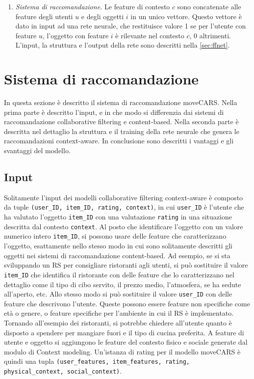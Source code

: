 \documentclass[12pt,italian]{report}
\begin{document}
\begin{enumerate}
 \item \textit{Sistema di raccomandazione.} Le feature di contesto $c$ sono concatenate alle feature degli utenti $u$ e degli oggetti $i$ in un unico vettore. Questo vettore è dato in input ad una rete neurale, che restituisce valore 1 se per l'utente con feature $u$, l'oggetto con feature $i$ è rilevante nel contesto $c$, 0 altrimenti. L'input, la struttura e l'output della rete sono descritti nella \autoref{sec:ffnet}.
\end{enumerate}

\section{Sistema di raccomandazione} \label{sec:ffnet}
In questa sezione è descritto il sistema di raccomandazione moveCARS. Nella prima parte è descritto l'input, e in che modo si differenzia dai sistemi di raccomandazione collaborative filtering e content-based. Nella seconda parte è descritta nel dettaglio la struttura e il training della rete neurale che genera le raccomandazioni context-aware. In conclusione sono descritti i vantaggi e gli svantaggi del modello.

\subsection{Input}
Solitamente l'input dei modelli collaborative filtering context-aware è composto da tuple \texttt{(user\_ID, item\_ID, rating, context)}, in cui \texttt{user\_ID} è l'utente che ha valutato l'oggetto \texttt{item\_ID} con una valutazione \texttt{rating} in una situazione descritta dal contesto \texttt{context}. Al posto che identificare l'oggetto con un valore numerico intero \texttt{item\_ID}, si possono usare delle feature che caratterizzano l'oggetto, esattamente nello stesso modo in cui sono solitamente descritti gli oggetti nei sistemi di raccomandazione content-based. Ad esempio, se si sta sviluppando un RS per consigliare ristoranti agli utenti, si può sostituire il valore \texttt{item\_ID} che identifica il ristorante con delle feature che lo caratterizzano nel dettaglio come il tipo di cibo servito, il prezzo medio, l'atmosfera, se ha sedute all'aperto, etc. Allo stesso modo si può sostituire il valore \texttt{user\_ID} con delle feature che descrivono l'utente. Queste possono essere feature non specifiche come età o genere, o feature specifiche per l'ambiente in cui il RS è implementato. Tornando all'esempio dei ristoranti, si potrebbe chiedere all'utente quanto è disposto a spendere per mangiare fuori e il tipo di cucina preferita. A feature di utente e oggetto si aggiungono le feature del contesto fisico e sociale generate dal modulo di Context modeling. Un'istanza di rating per il modello moveCARS è quindi una tupla \texttt{(user\_features, item\_features, rating, physical\_context, social\_context)}.
\end{document}
